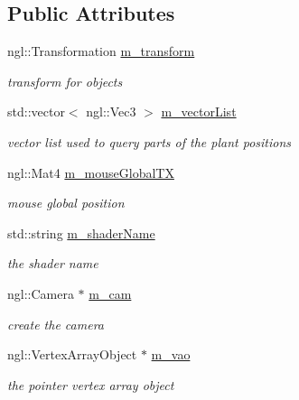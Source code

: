 \subsection*{Public Attributes}
\begin{DoxyCompactItemize}
\item 
ngl::Transformation \hyperlink{classdrawPlant_af4fb974b7d22e9e689ca056fb463cbd2}{m\_\-transform}
\begin{DoxyCompactList}\small\item\em transform for objects \item\end{DoxyCompactList}\item 
std::vector$<$ ngl::Vec3 $>$ \hyperlink{classdrawPlant_af985e9e9a97e3bb279767dfb9df62b2e}{m\_\-vectorList}
\begin{DoxyCompactList}\small\item\em vector list used to query parts of the plant positions \item\end{DoxyCompactList}\item 
ngl::Mat4 \hyperlink{classdrawPlant_aa2f75ddd1c6678f303a98d55d29b98da}{m\_\-mouseGlobalTX}
\begin{DoxyCompactList}\small\item\em mouse global position \item\end{DoxyCompactList}\item 
std::string \hyperlink{classdrawPlant_ae7c41f7bf312aed18ccee672ed927a2a}{m\_\-shaderName}
\begin{DoxyCompactList}\small\item\em the shader name \item\end{DoxyCompactList}\item 
ngl::Camera $\ast$ \hyperlink{classdrawPlant_a7df5109e180023ac117c8a84d7976c8f}{m\_\-cam}
\begin{DoxyCompactList}\small\item\em create the camera \item\end{DoxyCompactList}\item 
ngl::VertexArrayObject $\ast$ \hyperlink{classdrawPlant_a11498c9df9fbd17b2a1cb55942aff57b}{m\_\-vao}
\begin{DoxyCompactList}\small\item\em the pointer vertex array object \item\end{DoxyCompactList}\end{DoxyCompactItemize}


